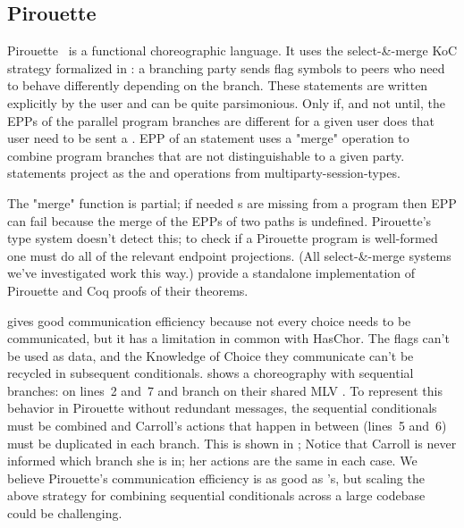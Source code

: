 \subsection{Pirouette}\label{pirouette}
Pirouette~\cite{hirsch2021pirouette} is a functional choreographic language.
It uses the select-\&-merge KoC strategy formalized in \cite{montesi-carbone-dfbd}:
a branching party sends flag symbols to peers who need to behave differently depending on the branch.
These  statements are written explicitly by the user and can be quite parsimonious.
Only if, and not until, the EPPs of the parallel program branches are different for a given user does that user need
to be sent a .
EPP of an  statement uses a "merge" operation to combine program branches that are not distinguishable to a given party.
 statements project as the  and  operations from multiparty-session-types.

The "merge" function is partial; if needed s are missing from a program
then EPP can fail because the merge of the EPPs of two paths is undefined.
Pirouette's type system doesn't detect this; to check if a Pirouette program is well-formed
one must do all of the relevant endpoint projections.
(All select-\&-merge systems we've investigated work this way.)
\cite{hirsch2021pirouette} provide a standalone implementation of Pirouette
and Coq proofs of their theorems.

 gives good communication efficiency because not every choice needs to be communicated,
but it has a limitation in common with HasChor.
The  flags can't be used as data,
and the Knowledge of Choice they communicate can't be recycled in subsequent conditionals.
 shows a \HLSCentral choreography with sequential branches:
on lines~2 and~7  and  branch on their shared MLV .
To represent this behavior in Pirouette without redundant messages,
the sequential conditionals must be combined and Carroll's actions that happen in between (lines~5 and~6)
must be duplicated in each branch.
This is shown in ;
Notice that Carroll is never informed which branch she is in; her actions are the same in each case.
We believe Pirouette's communication efficiency is as good as \HLSCentral's,
but scaling the above strategy for combining sequential conditionals across a large codebase
could be challenging.

